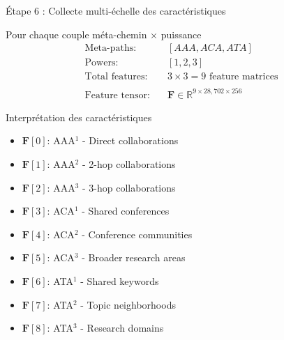 \documentclass[9pt,aspectratio=169,professionalfonts]{beamer}
\begin{document}
\begin{frame}{Étape 6 : Collecte multi-échelle des caractéristiques}
\begin{block}{Pour chaque couple méta-chemin $\times$ puissance}
\begin{align*}
\text{Meta-paths:} &\quad [AAA, ACA, ATA] \\
\text{Powers:} &\quad [1, 2, 3] \\
\text{Total features:} &\quad 3 \times 3 = 9 \text{ feature matrices} \\
\\
\text{Feature tensor:} &\quad \mathbf{F} \in \mathbb{R}^{9 \times 28,702 \times 256}
\end{align*}
\end{block}

\begin{block}{Interprétation des caractéristiques}
\begin{itemize}
    \item $\mathbf{F}[0]$: AAA$^1$ - Direct collaborations
    \item $\mathbf{F}[1]$: AAA$^2$ - 2-hop collaborations  
    \item $\mathbf{F}[2]$: AAA$^3$ - 3-hop collaborations
    \item $\mathbf{F}[3]$: ACA$^1$ - Shared conferences
    \item $\mathbf{F}[4]$: ACA$^2$ - Conference communities
    \item $\mathbf{F}[5]$: ACA$^3$ - Broader research areas
    \item $\mathbf{F}[6]$: ATA$^1$ - Shared keywords
    \item $\mathbf{F}[7]$: ATA$^2$ - Topic neighborhoods  
    \item $\mathbf{F}[8]$: ATA$^3$ - Research domains
\end{itemize}
\end{block}
\end{frame}
\end{document}
